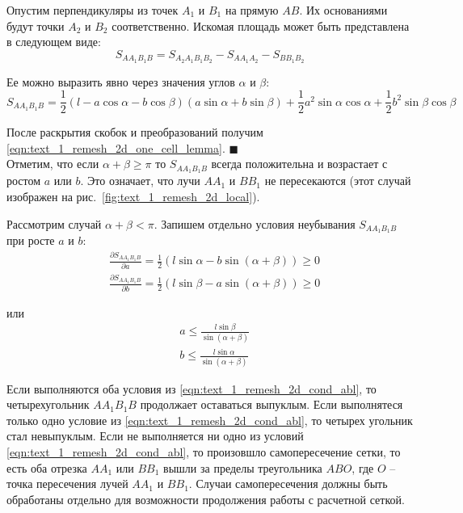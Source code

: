 Опустим перпендикуляры из точек $A_1$ и $B_1$ на прямую $AB$.
Их основаниями будут точки $A_2$ и $B_2$ соответственно.
Искомая площадь может быть представлена в следующем виде:
\begin{equation}
S_{AA_1B_1B} = S_{A_2A_1B_1B_2} - S_{AA_1A_2} - S_{BB_1B_2}
\end{equation}

Ее можно выразить явно через значения углов $\alpha$ и $\beta$:
\begin{equation}
S_{AA_1B_1B} = \frac{1}{2}(l - a \cos \alpha - b \cos \beta)(a \sin \alpha + b \sin \beta) + \frac{1}{2}a^2 \sin \alpha \cos \alpha + \frac{1}{2}b^2 \sin \beta \cos \beta
\end{equation}

После раскрытия скобок и преобразований получим \eqref{eqn:text_1_remesh_2d_one_cell_lemma}.
$\blacksquare$\\

Отметим, что если $\alpha + \beta \ge \pi$ то $S_{AA_1B_1B}$ всегда положительна и возрастает с ростом $a$ или $b$.
Это означает, что лучи $AA_1$ и $BB_1$ не пересекаются (этот случай изображен на рис.~\ref{fig:text_1_remesh_2d_local}).

Рассмотрим случай $\alpha + \beta < \pi$.
Запишем отдельно условия неубывания $S_{AA_1B_1B}$ при росте $a$ и $b$:
\begin{equation}
	\begin{aligned}
		& \frac{\partial S_{AA_1B_1B}}{\partial a} = \frac{1}{2}(l \sin \alpha - b \sin (\alpha + \beta)) \ge 0 \\
		& \frac{\partial S_{AA_1B_1B}}{\partial b} = \frac{1}{2}(l \sin \beta - a \sin (\alpha + \beta)) \ge 0
	\end{aligned}
\end{equation}

или
\begin{equation}\label{eqn:text_1_remesh_2d_cond_abl}
	\begin{aligned}
		& a \le \frac{l \sin \beta}{\sin (\alpha + \beta)} \\
		& b \le \frac{l \sin \alpha}{\sin (\alpha + \beta)}
	\end{aligned}
\end{equation}

Если выполняются оба условия из \eqref{eqn:text_1_remesh_2d_cond_abl}, то четырехугольник $AA_1B_1B$ продолжает оставаться выпуклым.
Если выполнятеся только одно условие из \eqref{eqn:text_1_remesh_2d_cond_abl}, то четырех угольник стал невыпуклым.
Если не выполняется ни одно из условий \eqref{eqn:text_1_remesh_2d_cond_abl}, то произовшло самопересечение сетки, то есть оба отрезка $AA_1$ или $BB_1$ вышли за пределы треугольника $ABO$, где $O$ -- точка пересечения лучей $AA_1$ и $BB_1$.
Случаи самопересечения должны быть обработаны отдельно для возможности продолжения работы с расчетной сеткой.


